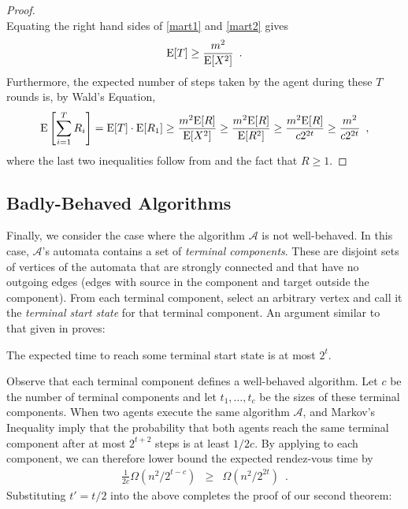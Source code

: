 \documentclass{patmorin}
\begin{document}
\begin{proof}
\begin{equation}
\end{equation}
Equating the right hand sides of \eqref{mart1} and \eqref{mart2} gives 
\[
   \mathrm{E}[T] \ge \frac{m^2}{\mathrm{E}[X^2]} \enspace .
\]
Furthermore, the expected number of steps taken by the agent during
these $T$ rounds is, by Wald's Equation, 
\begin{equation}
  \E\left[\sum_{i=1}^T R_i\right] 
    =  \E[T]\cdot\E[R_1] 
    \ge \frac{m^2 \E[R]}{\E[X^2]} 
    \ge \frac{m^2 \E[R]}{\E[R^2]}
    \ge \frac{m^2 \E[R]}{c2^{2t}} 
    \ge \frac{m^2}{c2^{2t}} 
   \enspace ,  \eqlabel{gap}
\end{equation}
where the last two inequalities follow from  and the
fact that $R\ge 1$.
\end{proof}

\subsection{Badly-Behaved Algorithms}

Finally, we consider the case where the algorithm $\mathcal{A}$ is not
well-behaved.  In this case, $\mathcal{A}$'s automata contains a set
of \emph{terminal components}.  These are disjoint sets of vertices of the
automata that are strongly connected and that have no outgoing edges (edges
with source in the component and target outside the component). From each 
terminal component, select an arbitrary vertex and call it
the \emph{terminal start state} for that terminal component.
An argument similar to that given in  proves:

\begin{lem}
The expected time to reach some terminal start state is at most $2^t$.
\end{lem}

Observe that each terminal component defines a well-behaved algorithm.
Let $c$ be the number of terminal components and let $t_1,\ldots,t_c$ be
the sizes of these terminal components.  When two agents execute the same
algorithm $\mathcal{A}$,  and Markov's Inequality
imply that the probability
that both agents reach the same terminal component after at most $2^{t+2}$
steps is at least $1/2c$.  By applying  to each component, we can therefore lower bound the expected rendez-vous time by
\begin{eqnarray*}
  \frac{1}{2c}\Omega(n^2/2^{t-c})
    & \ge & \Omega(n^2/2^{2t}) \enspace .
\end{eqnarray*}
Substituting $t'=t/2$ into the above completes the proof of our second theorem:
\end{document}
